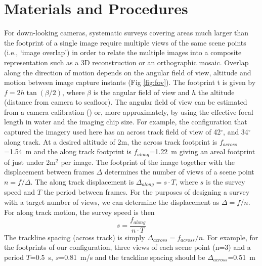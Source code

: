 \section{Materials and Procedures}
\label{sec:MandP}


For down-looking cameras, systematic surveys covering areas much larger than the footprint of a single image require multiple views of the same scene points (i.e., `image overlap') in order to relate the multiple images into a composite representation such as a 3D reconstruction or an orthographic mosaic. Overlap along the direction of motion depends on the angular field of view, altitude and motion between image capture instants (Fig \ref{fig:fov}). The footprint t is given by $f = 2 h \tan(\beta/2)$, where $\beta$ is the angular field of view and $h$ the altitude (distance from camera to seafloor). The angular field of view can be estimated from a camera calibration (\cite{bouguet2004camera}) or, more approximately, by using the effective focal length in water and the imaging chip size. For example, the configuration that captured the imagery used here has an across track field of view of 42$^\circ$, and 34$^\circ$ along track. At a desired altitude of 2m, the across track footprint is $f_{across}$=1.54~m and the along track footprint is $f_{along}$=1.22~m giving an areal footprint of just under 2m$^2$ per image. 
The footprint of the image together with the displacement between frames $\Delta$ determines the number of views of a scene point $n = f /\Delta$. The along track displacement is $\Delta_{along} = s \cdot T$, where $s$ is the survey speed and $T$ the period between frames. 
For the purposes of designing a survey with a target number of views, we can determine the displacement as $\Delta = f/n$. For along track motion, the survey speed is then
\begin{equation}
s = \frac{f_{along}}{n \cdot T}
\end{equation}
The trackline spacing (across track) is simply $\Delta_{across} = f_{across}/n$.
For example, for the footprints of our configuration, three views of each scene point (n=3) and a period $T$=0.5~s, $s$=0.81~m/s and the trackline spacing should be $\Delta_{across}$=0.51~m

